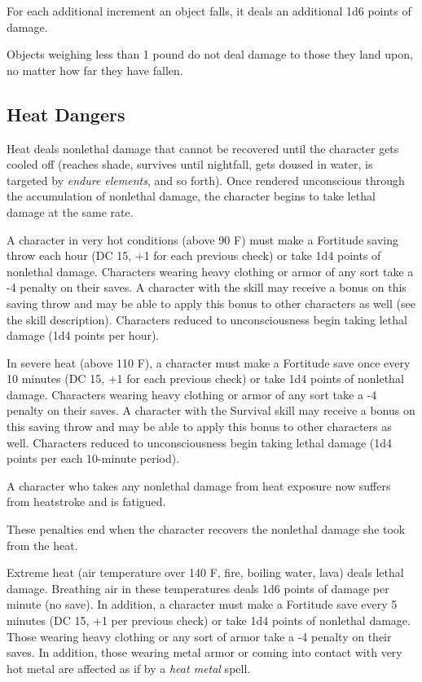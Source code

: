For each additional increment an object falls, it deals an additional 1d6 points 
of damage.

Objects weighing less than 1 pound do not deal damage to those they land upon, 
no matter how far they have fallen.

\subsection{Heat Dangers}

Heat deals nonlethal damage that cannot be recovered until the character gets cooled 
off (reaches shade, survives until nightfall, gets doused in water, is targeted 
by \textit{endure elements}, and so forth). Once rendered unconscious through the 
accumulation of nonlethal damage, the character begins to take lethal damage at 
the same rate.

A character in very hot conditions (above 90\textdegree{} F) must make a Fortitude saving 
throw each hour (DC 15, +1 for each previous check) or take 1d4 points of nonlethal 
damage. Characters wearing heavy clothing or armor of any sort take a -4 penalty 
on their saves. A character with the  skill may receive a bonus on this 
saving throw and may be able to apply this bonus to other characters as well (see 
the skill description). Characters reduced to unconsciousness begin taking lethal 
damage (1d4 points per hour).

In severe heat (above 110\textdegree{} F), a character must make a Fortitude save once every 
10 minutes (DC 15, +1 for each previous check) or take 1d4 points of nonlethal 
damage. Characters wearing heavy clothing or armor of any sort take a -4 penalty 
on their saves. A character with the Survival skill may receive a bonus on this 
saving throw and may be able to apply this bonus to other characters as well. Characters 
reduced to unconsciousness begin taking lethal damage (1d4 points per each 10-minute 
period).

A character who takes any nonlethal damage from heat exposure now suffers from 
heatstroke and is fatigued.

These penalties end when the character recovers the nonlethal damage she took from 
the heat.

Extreme heat (air temperature over 140\textdegree{} F, fire, boiling water, lava) deals lethal 
damage. Breathing air in these temperatures deals 1d6 points of damage per minute 
(no save). In addition, a character must make a Fortitude save every 5 minutes 
(DC 15, +1 per previous check) or take 1d4 points of nonlethal damage. Those wearing 
heavy clothing or any sort of armor take a -4 penalty on their saves. In addition, 
those wearing metal armor or coming into contact with very hot metal are affected 
as if by a \textit{heat metal }spell.

